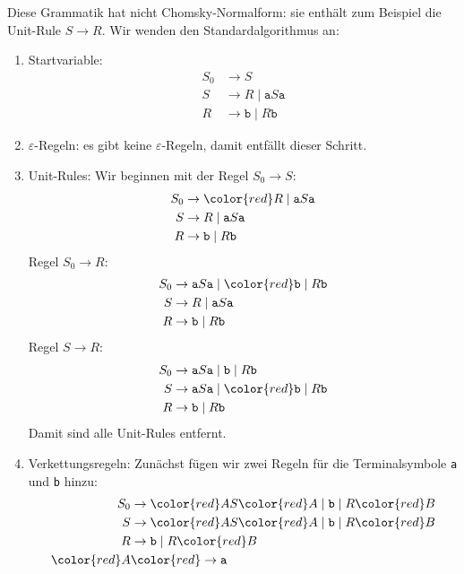 \begin{loesung}
Diese Grammatik hat nicht Chomsky-Normalform: sie enthält zum Beispiel die
Unit-Rule $S\rightarrow R$.
Wir wenden den Standardalgorithmus an:
\begin{enumerate}
\item Startvariable: 
\begin{align*}
S_0&\rightarrow S                      \\
S  &\rightarrow R  \mid  \texttt{a} S \texttt{a}\\
R  &\rightarrow \texttt{b} \mid  R\texttt{b}
\end{align*}
\item $\varepsilon$-Regeln: es gibt keine $\varepsilon$-Regeln, damit
entfällt dieser Schritt.
\item Unit-Rules: Wir beginnen mit der Regel $S_0\rightarrow S$:
\begin{align*}
S_0&\rightarrow \color{red} R  \mid  \texttt{a} S \texttt{a}\\
S  &\rightarrow R  \mid  \texttt{a} S \texttt{a}\\
R  &\rightarrow \texttt{b} \mid  R\texttt{b}
\end{align*}
Regel $S_0\rightarrow R$:
\begin{align*}
S_0&\rightarrow \texttt{a} S \texttt{a} \mid  \color{red}\texttt{b} \mid  R\texttt{b} \\
S  &\rightarrow R  \mid  \texttt{a} S \texttt{a}\\
R  &\rightarrow \texttt{b} \mid  R\texttt{b}
\end{align*}
Regel $S\rightarrow R$:
\begin{align*}
S_0&\rightarrow \texttt{a} S \texttt{a} \mid  \texttt{b} \mid  R\texttt{b} \\
S  &\rightarrow \texttt{a} S \texttt{a} \mid  \color{red} \texttt{b} \mid  R\texttt{b}\\
R  &\rightarrow \texttt{b} \mid  R\texttt{b}
\end{align*}
Damit sind alle Unit-Rules entfernt.
\item Verkettungsregeln: Zunächst fügen wir zwei Regeln für die
Terminalsymbole \texttt{a} und \texttt{b} hinzu:
\begin{align*}
S_0&\rightarrow {\color{red}A}S{\color{red}A} \mid  \texttt{b} \mid  R{\color{red}B} \\
S  &\rightarrow {\color{red}A}S{\color{red}A} \mid  \texttt{b} \mid  R{\color{red}B} \\
R  &\rightarrow \texttt{b} \mid  R{\color{red}B} \\
\color{red}A  &\color{red}\rightarrow \texttt{a} \\

\end{align*}
\end{enumerate}
\end{loesung}
